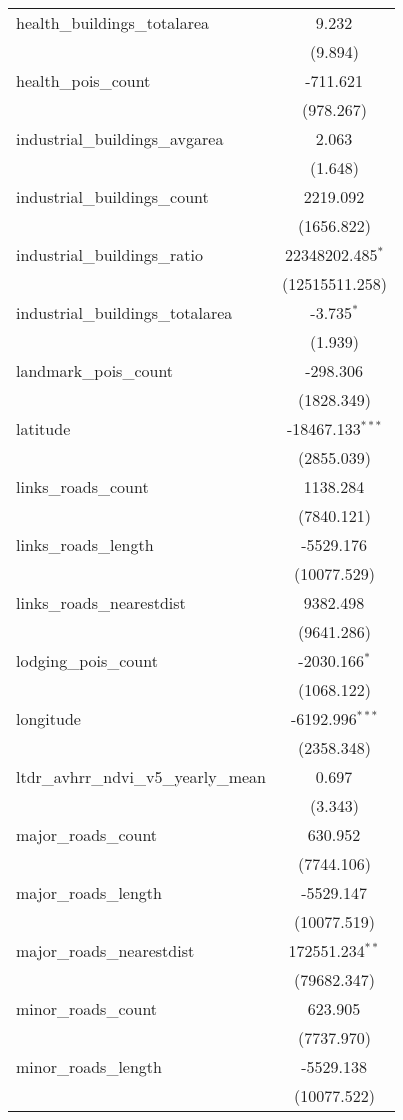 \begin{table}[!htbp]
\begin{tabular}{@{\extracolsep{5pt}}lc}
 health_buildings_totalarea & 9.232$^{}$ \\
  & (9.894) \\
 health_pois_count & -711.621$^{}$ \\
  & (978.267) \\
 industrial_buildings_avgarea & 2.063$^{}$ \\
  & (1.648) \\
 industrial_buildings_count & 2219.092$^{}$ \\
  & (1656.822) \\
 industrial_buildings_ratio & 22348202.485$^{*}$ \\
  & (12515511.258) \\
 industrial_buildings_totalarea & -3.735$^{*}$ \\
  & (1.939) \\
 landmark_pois_count & -298.306$^{}$ \\
  & (1828.349) \\
 latitude & -18467.133$^{***}$ \\
  & (2855.039) \\
 links_roads_count & 1138.284$^{}$ \\
  & (7840.121) \\
 links_roads_length & -5529.176$^{}$ \\
  & (10077.529) \\
 links_roads_nearestdist & 9382.498$^{}$ \\
  & (9641.286) \\
 lodging_pois_count & -2030.166$^{*}$ \\
  & (1068.122) \\
 longitude & -6192.996$^{***}$ \\
  & (2358.348) \\
 ltdr_avhrr_ndvi_v5_yearly_mean & 0.697$^{}$ \\
  & (3.343) \\
 major_roads_count & 630.952$^{}$ \\
  & (7744.106) \\
 major_roads_length & -5529.147$^{}$ \\
  & (10077.519) \\
 major_roads_nearestdist & 172551.234$^{**}$ \\
  & (79682.347) \\
 minor_roads_count & 623.905$^{}$ \\
  & (7737.970) \\
 minor_roads_length & -5529.138$^{}$ \\
  & (10077.522) \\

\end{tabular}
\end{table}
